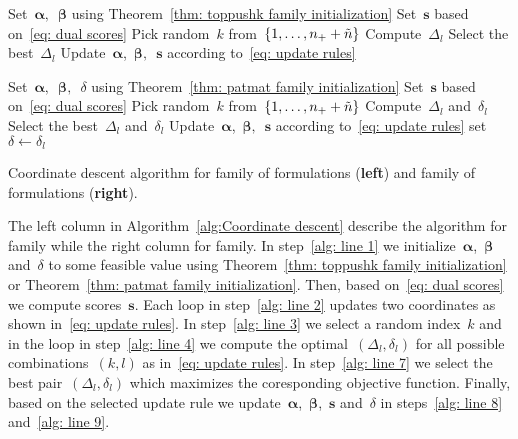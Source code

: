 \begin{algorithm*}
  \begin{minipage}{0.48\textwidth}
    \centering
    \begin{algorithmic}[1]
      \State Set~$\bm{\alpha},$~$\bm{\beta}$ using Theorem~\ref{thm: toppushk family initialization}
      \State Set~$\bm{s}$ based on~\eqref{eq: dual scores} \label{alg: line 1}
      \Repeat \label{alg: line 2}
        \State Pick random~$k$ from~$\{1, \ldots, n_{+} + \tilde{n}\}$ \label{alg: line 3}
         \label{alg: line 4}
            \State Compute~$\Delta_{l}$  \label{alg: line 5}
        \EndFor
        \State Select the best~$\Delta_{l}$ \label{alg: line 7}
        \State Update~$\bm{\alpha}$,~$\bm{\beta},$~$\bm{s}$ according to~\eqref{eq: update rules} \label{alg: line 8}
        \State \label{alg: line 9}
    \end{algorithmic}
  \end{minipage}%
  \hfill
  \begin{minipage}{0.48\textwidth}
    \centering
    \begin{algorithmic}[1]
      \State Set~$\bm{\alpha},$~$\bm{\beta},$~$\delta$ using Theorem~\ref{thm: patmat family initialization}
      \State Set~$\bm{s}$ based on~\eqref{eq: dual scores}
      \Repeat
        \State Pick random~$k$ from~$\{1, \ldots, n_{+} + \tilde{n} \}$ 
            \State Compute~$\Delta_{l}$ and~$\delta_{l}$
        \EndFor
        \State Select the best~$\Delta_{l}$ and~$\delta_{l}$
        \State Update~$\bm{\alpha}$,~$\bm{\beta},$~$\bm{s}$ according to~\eqref{eq: update rules}
        \State set~$\delta \leftarrow \delta_{l}$
    \end{algorithmic}
  \end{minipage}
  \caption{Coordinate descent algorithm for \TopPushK family of formulations (\textbf{left}) and \PatMat  family of formulations (\textbf{right}).}
  \label{alg:Coordinate descent}
\end{algorithm*}

The left column in Algorithm~\ref{alg:Coordinate descent} describe the algorithm for \TopPushK family while the right column for \PatMat family. In step~\ref{alg: line 1} we initialize~$\bm{\alpha}$,~$\bm{\beta}$ and~$\delta$ to some feasible value using Theorem~\ref{thm: toppushk family initialization} or  Theorem~\ref{thm: patmat family initialization}. Then, based on~\eqref{eq: dual scores} we compute scores~$\bm{s}$. Each \repeatloop loop in step~\ref{alg: line 2} updates two coordinates as shown in~\eqref{eq: update rules}. In step~\ref{alg: line 3} we select a random index~$k$ and in the \forloop loop in step~\ref{alg: line 4} we compute the optimal~$(\Delta_l,\delta_l)$ for all possible combinations~$(k,l)$ as in~\eqref{eq: update rules}. In step~\ref{alg: line 7} we select the best pair~$(\Delta_l,\delta_l)$ which maximizes the coresponding objective function. Finally, based on the selected update rule we update~$\bm{\alpha}$,~$\bm{\beta}$,~$\bm{s}$ and~$\delta$ in steps~\ref{alg: line 8} and~\ref{alg: line 9}.

